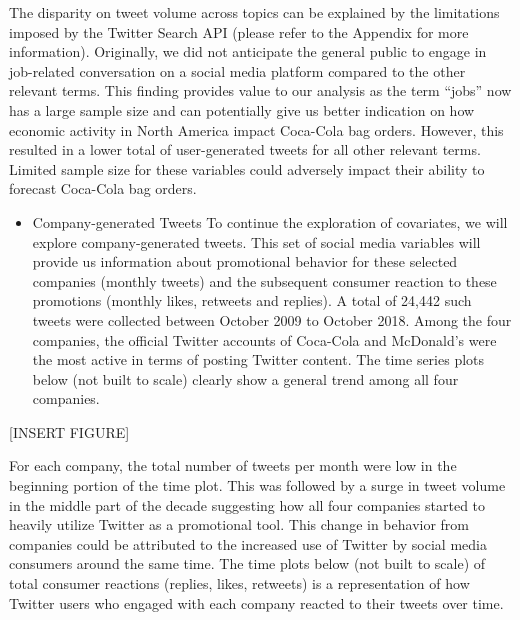 \documentclass[12pt,oneside]{chicagocapstone}
\providecommand{\tightlist}{%
  \setlength{\itemsep}{0pt}\setlength{\parskip}{0pt}}
\begin{document}
The disparity on tweet volume across topics can be explained by the limitations imposed by the Twitter Search API (please refer to the Appendix for more information). Originally, we did not anticipate the general public to engage in job-related conversation on a social media platform compared to the other relevant terms. This finding provides value to our analysis as the term ``jobs'' now has a large sample size and can potentially give us better indication on how economic activity in North America impact Coca-Cola bag orders. However, this resulted in a lower total of user-generated tweets for all other relevant terms. Limited sample size for these variables could adversely impact their ability to forecast Coca-Cola bag orders.
\begin{itemize}
\tightlist
\item
  Company-generated Tweets
  To continue the exploration of covariates, we will explore company-generated tweets. This set of social media variables will provide us information about promotional behavior for these selected companies (monthly tweets) and the subsequent consumer reaction to these promotions (monthly likes, retweets and replies). A total of 24,442 such tweets were collected between October 2009 to October 2018. Among the four companies, the official Twitter accounts of Coca-Cola and McDonald's were the most active in terms of posting Twitter content. The time series plots below (not built to scale) clearly show a general trend among all four companies.
\end{itemize}
{[}INSERT FIGURE{]}

For each company, the total number of tweets per month were low in the beginning portion of the time plot. This was followed by a surge in tweet volume in the middle part of the decade suggesting how all four companies started to heavily utilize Twitter as a promotional tool. This change in behavior from companies could be attributed to the increased use of Twitter by social media consumers around the same time. The time plots below (not built to scale) of total consumer reactions (replies, likes, retweets) is a representation of how Twitter users who engaged with each company reacted to their tweets over time.
\end{document}
